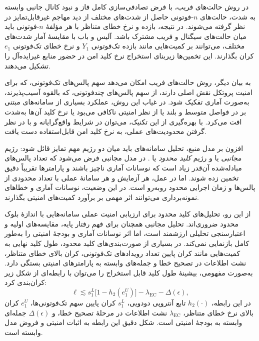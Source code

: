 در روش حالت‌های فریب، با فرض تصادفی‌سازی کامل فاز و نبود کانال جانبی وابسته به شدت، حالت‌های \(n\)-فوتونی حاصل از شدت‌های مختلف از دید مهاجم غیرقابل‌تمایز در نظر گرفته می‌شوند. در نتیجه، بازده و نرخ خطای متناظر با هر مؤلفهٔ \(n\)-فوتونی باید میان حالت‌های سیگنال و فریب مشترک باشد. آلیس و باب با مقایسهٔ آمار شدت‌های مختلف، می‌توانند بر کمیت‌هایی مانند بازده تک‌فوتونی \(Y_1\) و نرخ خطای تک‌فوتونی \(e_1\) کران بگذارند. این تخمین‌ها زیربنای استخراج نرخ کلید امن در حضور منابع غیرایده‌آل را تشکیل می‌دهند.

به بیان دیگر، روش حالت‌های فریب امکان می‌دهد سهم پالس‌های تک‌فوتونی، که برای امنیت پروتکل نقش اصلی دارند، از سهم پالس‌های چندفوتونی، که بالقوه آسیب‌پذیرند، به‌صورت آماری تفکیک شود. در غیاب این روش، عملکرد بسیاری از سامانه‌های مبتنی بر  در فواصل متوسط و بلند یا از نظر امنیتی ناکافی می‌بود یا نرخ کلید آن‌ها به‌شدت افت می‌کرد. با بهره‌گیری از این تکنیک، می‌توان در شرایط واقع‌گرایانه و با در نظر گرفتن محدودیت‌های عملی، به نرخ کلید امن قابل‌استفاده دست یافت.

افزون بر مدل منبع، تحلیل سامانه‌های  باید میان دو رژیم مهم تمایز قائل شود: رژیم \textit{مجانبی} یا  و رژیم \textit{کلید محدود} یا . در مدل مجانبی فرض می‌شود که تعداد پالس‌های مبادله‌شده آن‌قدر زیاد است که نوسانات آماری ناچیز باشند و پارامترها تقریباً دقیق تخمین زده شوند. اما در عمل، هر آزمایش و هر سامانهٔ عملی با تعداد محدودی از پالس‌ها و زمان اجرایی محدود روبه‌رو است. در این وضعیت، نوسانات آماری و خطاهای نمونه‌برداری می‌توانند اثر مهمی بر برآورد کمیت‌های امنیتی بگذارند.

از این رو، تحلیل‌های کلید محدود برای ارزیابی امنیت عملی سامانه‌هایی با اندازهٔ بلوک محدود ضروری‌اند. تحلیل مجانبی همچنان برای فهم رفتار پایه، مقایسه‌های اولیه و اعتبارسنجی تحلیلی ارزشمند است، اما اثر نوسانات آماری و بودجهٔ امنیتی را به‌طور کامل بازنمایی نمی‌کند. در بسیاری از صورت‌بندی‌های کلید محدود، طول کلید نهایی به کمیت‌هایی مانند کران پایین تعداد رویدادهای تک‌فوتونی، کران بالای خطای متناظر، نشت اطلاعات در تصحیح خطا و جمله‌های وابسته به پارامترهای امنیتی بستگی دارد. به‌صورت مفهومی، بیشینهٔ طول کلید قابل استخراج را می‌توان با رابطه‌ای از شکل زیر کران‌بندی کرد:
\[
\ell \lesssim s_{1}^{L}\bigl[1-h_2(e_{1}^{U})\bigr]
-\lambda_{\mathrm{EC}}
-\Delta(\epsilon),
\]
در این رابطه، \(h_2(\cdot)\) تابع آنتروپی دودویی، \(s_{1}^{L}\) کران پایین سهم تک‌فوتونی‌ها، \(e_{1}^{U}\) کران بالای نرخ خطای متناظر، \(\lambda_{\mathrm{EC}}\) نشت اطلاعات در مرحلهٔ تصحیح خطا، و \(\Delta(\epsilon)\) جمله‌ای وابسته به بودجهٔ امنیتی است. شکل دقیق این رابطه به اثبات امنیتی و فروض مدل وابسته است.

